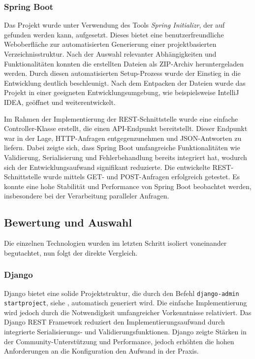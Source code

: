 \subsubsection{Spring Boot}

Das Projekt wurde unter Verwendung des Tools \textit{Spring Initializr}, der auf \cite{website-spring-initializr} gefunden werden kann, aufgesetzt. Dieses bietet eine benutzerfreundliche Weboberfläche zur automatisierten Generierung einer projektbasierten Verzeichnisstruktur. Nach der Auswahl relevanter Abhängigkeiten und Funktionalitäten konnten die erstellten Dateien als ZIP-Archiv heruntergeladen werden. Durch diesen automatisierten Setup-Prozess wurde der Einstieg in die Entwicklung deutlich beschleunigt. Nach dem Entpacken der Dateien wurde das Projekt in einer geeigneten Entwicklungsumgebung, wie beispielsweise IntelliJ IDEA, geöffnet und weiterentwickelt.

Im Rahmen der Implementierung der REST-Schnittstelle wurde eine einfache Controller-Klasse erstellt, die einen API-Endpunkt bereitstellt. Dieser Endpunkt war in der Lage, HTTP-Anfragen entgegenzunehmen und JSON-Antworten zu liefern. Dabei zeigte sich, dass Spring Boot umfangreiche Funktionalitäten wie Validierung, Serialisierung und Fehlerbehandlung bereits integriert hat, wodurch sich der Entwicklungsaufwand signifikant reduzierte. Die entwickelte REST-Schnittstelle wurde mittels GET- und POST-Anfragen erfolgreich getestet. Es konnte eine hohe Stabilität und Performance von Spring Boot beobachtet werden, insbesondere bei der Verarbeitung paralleler Anfragen.


\subsection{Bewertung und Auswahl}

Die einzelnen Technologien wurden im letzten Schritt isoliert voneinander begutachtet, nun folgt der direkte Vergleich.

\subsubsection{Django}

Django bietet eine solide Projektstruktur, die durch den Befehl \texttt{django-admin startproject}, siehe \cite{website-django-admin}, automatisch generiert wird. Die einfache Implementierung wird jedoch durch die Notwendigkeit umfangreicher Vorkenntnisse relativiert. Das Django REST Framework reduziert den Implementierungsaufwand durch integrierte Serialisierungs- und Validierungsfunktionen. Django zeigte Stärken in der Community-Unterstützung und Performance, jedoch erhöhten die hohen Anforderungen an die Konfiguration den Aufwand in der Praxis.

